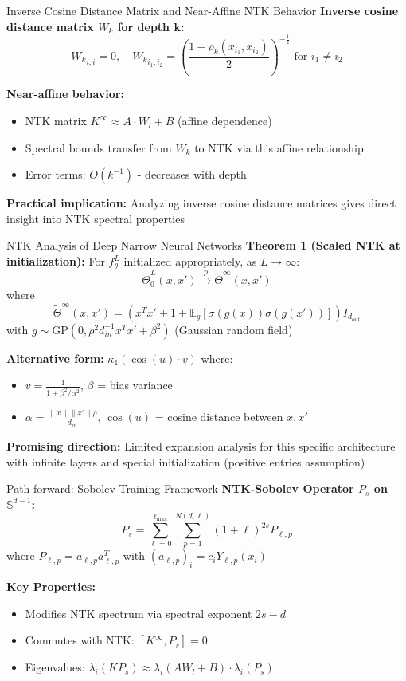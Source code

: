 \documentclass{beamer}
\newcommand{\E}{\mathbb{E}}
\newcommand{\limiting}[1]{#1^{\infty}}
\begin{document}
\begin{frame}{Inverse Cosine Distance Matrix and Near-Affine NTK Behavior}
\textbf{Inverse cosine distance matrix $W_k$ for depth k:}
\[ {W_k}_{i,i} = 0, \quad {W_k}_{i_1,i_2} = \left( \frac{1 - \rho_k(x_{i_1},x_{i_2})}{2} \right)^{-\frac{1}{2}} \text{ for } i_1 \neq i_2 \]

\textbf{Near-affine behavior:}
\begin{itemize}
\item NTK matrix $\limiting{K} \approx A \cdot W_l + B$ (affine dependence)
\item Spectral bounds transfer from $W_k$ to NTK via this affine relationship
\item Error terms: $O(k^{-1})$ - decreases with depth
\end{itemize}

\textbf{Practical implication:} Analyzing inverse cosine distance matrices gives direct insight into NTK spectral properties
\end{frame}


\begin{frame}{NTK Analysis of Deep Narrow Neural Networks}
\textbf{Theorem 1 (Scaled NTK at initialization):}
For $f^L_\theta$ initialized appropriately, as $L \to \infty$:
\[ \tilde{\Theta}^L_0(x, x') \xrightarrow{p} \tilde{\Theta}^\infty(x, x') \]
where
\[ \tilde{\Theta}^\infty(x, x') = (x^T x' + 1 + \E_g[\sigma(g(x))\sigma(g(x'))]) I_{d_{out}} \]
with $g \sim \text{GP}(0, \rho^2 d_{in}^{-1} x^T x' + \beta^2)$ (Gaussian random field)

\textbf{Alternative form:} $\kappa_1(\cos(u) \cdot v)$ where:
\begin{itemize}
\item $v = \frac{1}{1 + \beta^2/\alpha^2}$, $\beta$ = bias variance
\item $\alpha = \frac{\|x\| \|x'\| \rho}{d_{in}}$, $\cos(u)$ = cosine distance between $x, x'$
\end{itemize}

\textbf{Promising direction:} Limited expansion analysis for this specific architecture with infinite layers and special initialization (positive entries assumption)
\end{frame}

\begin{frame}{Path forward: Sobolev Training Framework}
\textbf{NTK-Sobolev Operator $P_s$ on $\mathbb{S}^{d-1}$:}
\[ P_s = \sum_{\ell=0}^{\ell_{\max}} \sum_{p=1}^{N(d,\ell)} (1+\ell)^{2s}P_{\ell,p} \]
where $P_{\ell,p} = a_{\ell,p}a_{\ell,p}^T$ with $(a_{\ell,p})_i = c_iY_{\ell,p}(x_i)$

\textbf{Key Properties:}
\begin{itemize}
\item Modifies NTK spectrum via spectral exponent $2s-d$
\item Commutes with NTK: $[K^{\infty}, P_s] = 0$ 
\item Eigenvalues: $\lambda_i(K P_s) \approx \lambda_i(A W_l + B) \cdot \lambda_i(P_s)$
\end{itemize}
\end{frame}
\end{document}
